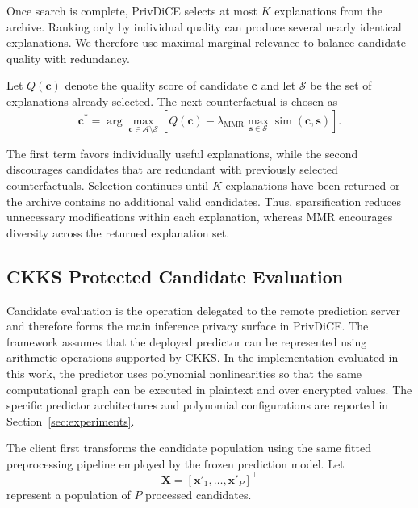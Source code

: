 \documentclass[preprint,12pt]{elsarticle}
\begin{document}
Once search is complete, PrivDiCE selects at most $K$ explanations from the
archive. Ranking only by individual quality can produce several nearly
identical explanations. We therefore use maximal marginal relevance
\cite{carbonell1998use} to balance candidate quality with redundancy.

Let $Q(\mathbf{c})$ denote the quality score of candidate $\mathbf{c}$ and let
$\mathcal{S}$ be the set of explanations already selected. The next
counterfactual is chosen as
\begin{equation}
\mathbf{c}^{*}
=
\arg\max_{\mathbf{c}\in\mathcal{A}\setminus\mathcal{S}}
\left[
Q(\mathbf{c})
-
\lambda_{\mathrm{MMR}}
\max_{\mathbf{s}\in\mathcal{S}}
\operatorname{sim}(\mathbf{c},\mathbf{s})
\right].
\label{eq:mmr_selection}
\end{equation}

The first term favors individually useful explanations, while the second
discourages candidates that are redundant with previously selected
counterfactuals. Selection continues until $K$ explanations have been returned
or the archive contains no additional valid candidates. Thus, sparsification
reduces unnecessary modifications within each explanation, whereas MMR
encourages diversity across the returned explanation set.


\subsection{CKKS Protected Candidate Evaluation}
\label{subsec:ckks_protocol}

Candidate evaluation is the operation delegated to the remote prediction
server and therefore forms the main inference privacy surface in PrivDiCE.
The framework assumes that the deployed predictor can be represented using
arithmetic operations supported by CKKS. In the implementation evaluated in
this work, the predictor uses polynomial nonlinearities so that the same
computational graph can be executed in plaintext and over encrypted values.
The specific predictor architectures and polynomial configurations are reported
in Section~\ref{sec:experiments}.

The client first transforms the candidate population using the same fitted
preprocessing pipeline employed by the frozen prediction model. Let
\begin{equation}
\mathbf{X}
=
\left[
\mathbf{x}'_{1},
\ldots,
\mathbf{x}'_{P}
\right]^{\top}
\end{equation}
represent a population of $P$ processed candidates.
\end{document}
